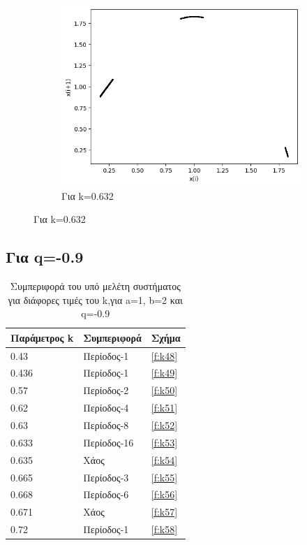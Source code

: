 \begin{figure}[h!]
\begin{subfigure}[b]{0.25\textwidth}
	\includegraphics[width=\textwidth]{LateX images/graphs q07/g13}
	\caption{Για k=0.632}
	\label{f:k47}
	\end{subfigure}
	
\end{figure}

\clearpage

\subsection{Για q=-0.9}

\begin{table}[h!]
	\centering
	\begin{tabular}{l | l | l}
		Παράμετρος k & Συμπεριφορά & Σχήμα\\
		\hline
		0.43 &  Περίοδος-1 & \ref{f:k48}\\
		0.436 &  Περίοδος-1 & \ref{f:k49}\\
		0.57& Περίοδος-2 & \ref{f:k50}\\
		0.62& Περίοδος-4 & \ref{f:k51}\\
		0.63 &  Περίοδος-8 & \ref{f:k52}\\
		0.633& Περίοδος-16 & \ref{f:k53}\\
		0.635& Χάος & \ref{f:k54}\\
		0.665 & Περίοδος-3 & \ref{f:k55}\\
		0.668 & Περίοδος-6 & \ref{f:k56}\\
		0.671 & Χάος & \ref{f:k57}\\
		0.72 & Περίοδος-1& \ref{f:k58}\\
	\end{tabular}
	\caption{ Συμπεριφορά του υπό μελέτη συστήματος για διάφορες τιμές του k,για a=1, b=2 και q=-0.9}
	\label{tab:abc4}
\end{table}

